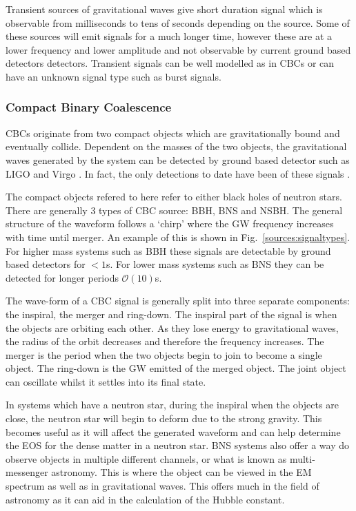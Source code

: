 Transient sources of gravitational waves give short duration signal which is observable from milliseconds to tens of seconds depending on the source. 
Some of these sources will emit signals for a much longer time, however these are at a lower frequency and lower amplitude and not observable by current ground based detectors detectors.
Transient signals can be well modelled as in \acp{CBC} or can have an unknown signal type such as burst signals.

\subsubsection{\label{sources:transient:cbc} Compact Binary Coalescence}

\acp{CBC} originate from two compact objects which are gravitationally bound and eventually collide.
Dependent on the masses of the two objects, the gravitational waves generated by the system can be detected by ground based detector such as LIGO \citep{} and Virgo \citep{}. 
In fact, the only detections to date have been of these signals \citep{}.

The compact objects refered to here refer to either black holes of neutron stars.
There are generally 3 types of \ac{CBC} source: \ac{BBH}, \ac{BNS} and \ac{NSBH}.
The general structure of the waveform follows a `chirp' where the \ac{GW} frequency increases with time until merger. An example of this is shown in Fig.~\ref{sources:signaltypes}.
For higher mass systems such as \ac{BBH} these signals are detectable by ground based detectors for $< 1$s. 
For lower mass systems such as \ac{BNS} they can be detected for longer periods $\mathcal{O}(10)$s. 

The wave-form of a \ac{CBC} signal is generally split into three separate components: the inspiral, the merger and ring-down. 
The inspiral part of the signal is when the objects are orbiting each other. As they lose energy to gravitational waves, the radius of the orbit decreases and therefore the frequency increases.
The merger is the period when the two objects begin to join to become a single object.
The ring-down is the \ac{GW} emitted of the merged object. The joint object can oscillate whilst it settles into its final state. 

In systems which have a neutron star, during the inspiral when the objects are close, the neutron star will begin to deform due to the strong gravity. 
This becomes useful as it will affect the generated waveform and can help determine the \ac{EOS} for the dense matter in a neutron star.
\ac{BNS} systems also offer a way do observe objects in multiple different channels, or what is known as multi-messenger astronomy. 
This is where the object can be viewed in the \ac{EM} spectrum as well as in gravitational waves.
This offers much in the field of astronomy as it can aid in the calculation of the Hubble constant. 

